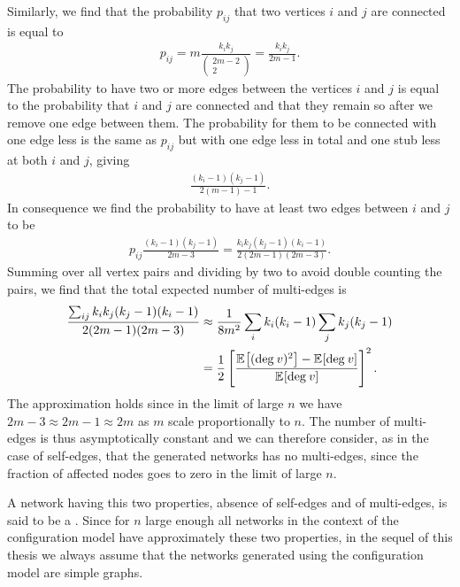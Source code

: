 \documentclass[
11pt, %
american, %
singlespacing, %
final, %
nolistspacing, %
liststotoc, %
headsepline, %
]{MastersDoctoralThesis} %
\begin{document}
Similarly, we find that the probability $p_{ij}$ that two vertices $i$ and $j$ are connected is equal to
\begin{align}
	p_{ij} = m \frac{k_i k_j}{ \begin{pmatrix} 2m - 2 \\ 2 \end{pmatrix} } = \frac{k_i k_j}{2 m -1}.
\end{align}
The probability to have two or more edges between the vertices $i$ and $j$ is equal to the probability that $i$ and $j$ are connected and that they remain so after we remove one edge between them. The probability for them to be connected with one edge less is the same as $p_{ij}$ but with one edge less in total and one stub less at both $i$ and $j$, giving
\begin{align}
	\frac{(k_i - 1)(k_j - 1)}{2 (m - 1) - 1}.
\end{align}
In consequence we find the probability to have at least two edges between $i$ and $j$ to be
\begin{align}
	p_{ij} \frac{(k_i - 1)(k_j - 1)}{2 m - 3} = \frac{k_i k_j (k_j - 1) (k_i - 1)}{2 (2 m - 1)(2 m - 3)}.
\end{align}
Summing over all vertex pairs and dividing by two to avoid double counting the pairs, we find that the total expected number of multi-edges is
\begin{align}
	\frac{\sum_{ij} k_i k_j (k_j - 1) (k_i - 1)}{2 (2 m - 1)(2 m - 3)}  &\approx \frac{1}{8 m^2} \sum_i k_i(k_i - 1) \sum_j k_j(k_j - 1) \\
	&= \frac{1}{2}\left[ \frac{\mathbb{E}_{}\!\left[ (\mathrm{deg}_{}\, v)^2 \right] - \mathbb{E}_{}\!\left[ \mathrm{deg}_{}\, v \right]}{\mathbb{E}_{}\!\left[ \mathrm{deg}_{}\, v \right]} \right]^2.
\end{align}
The approximation holds since in the limit of large $n$ we have $2 m - 3 \approx 2 m - 1 \approx 2 m$ as $m$ scale proportionally to $n$. The number of multi-edges is thus asymptotically constant and we can therefore consider, as in the case of self-edges, that the generated networks has no multi-edges, since the fraction of affected nodes goes to zero in the limit of large $n$.

A network having this two properties, absence of self-edges and of multi-edges, is said to be a . Since for $n$ large enough all networks in the context of the configuration model have approximately these two properties, in the sequel of this thesis we always assume that the networks generated using the configuration model are simple graphs.
\end{document}
